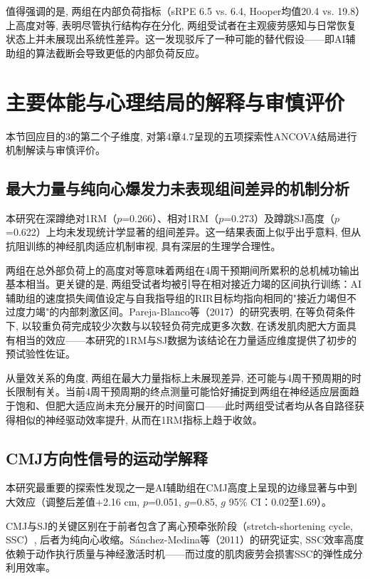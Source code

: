 值得强调的是, 两组在内部负荷指标（sRPE 6.5 vs. 6.4, Hooper均值20.4 vs. 19.8）上高度对等, 表明尽管执行结构存在分化, 两组受试者在主观疲劳感知与日常恢复状态上并未展现出系统性差异。这一发现驳斥了一种可能的替代假设——即AI辅助组的算法截断会导致更低的内部负荷反应。

\section{主要体能与心理结局的解释与审慎评价}
\label{sec:outcomes_discussion}

本节回应目的3的第二个子维度, 对第4章4.7呈现的五项探索性ANCOVA结局进行机制解读与审慎评价。

\subsection{最大力量与纯向心爆发力未表现组间差异的机制分析}
\label{sec:1rm_no_diff}

本研究在深蹲绝对1RM（$p$=0.266）、相对1RM（$p$=0.273）及蹲跳SJ高度（$p$=0.622）上均未发现统计学显著的组间差异。这一结果表面上似乎出乎意料, 但从抗阻训练的神经肌肉适应机制审视, 具有深层的生理学合理性。

两组在总外部负荷上的高度对等意味着两组在4周干预期间所累积的总机械功输出基本相当。更关键的是, 两组受试者均被引导在相对接近力竭的区间执行训练：AI辅助组的速度损失阈值设定与自我指导组的RIR目标均指向相同的"接近力竭但不过度力竭"的内部刺激区间。Pareja-Blanco等（2017）的研究表明, 在等负荷条件下, 以较重负荷完成较少次数与以较轻负荷完成更多次数, 在诱发肌肉肥大方面具有相当的效应——本研究的1RM与SJ数据为该结论在力量适应维度提供了初步的预试验性佐证。

从量效关系的角度, 两组在最大力量指标上未展现差异, 还可能与4周干预周期的时长限制有关。当前4周干预周期的终点测量可能恰好捕捉到两组在神经适应层面趋于饱和、但肥大适应尚未充分展开的时间窗口——此时两组受试者均从各自路径获得相似的神经驱动效率提升, 从而在1RM指标上趋于收敛。

\subsection{CMJ方向性信号的运动学解释}
\label{sec:cmj_signal}

本研究最重要的探索性发现之一是AI辅助组在CMJ高度上呈现的边缘显著与中到大效应（调整后差值+2.16 cm, $p$=0.051, $g$=0.85, $g$ 95\% CI：0.02至1.69）。

CMJ与SJ的关键区别在于前者包含了离心预牵张阶段（stretch-shortening cycle, SSC）, 后者为纯向心收缩。Sánchez-Medina等（2011）的研究证实, SSC效率高度依赖于动作执行质量与神经激活时机——而过度的肌肉疲劳会损害SSC的弹性成分利用效率。

